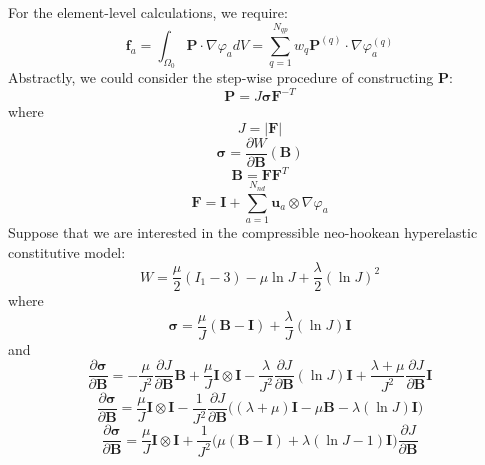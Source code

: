 \documentclass[12pt]{article}
\begin{document}
For the element-level calculations, we require:
\begin{equation}
	\mathbf{f}_a = \int_{\Omega_0} \mathbf{P} \cdot \nabla \varphi_a dV = \sum_{q = 1}^{N_{qp}} w_q \mathbf{P}^{(q)} \cdot \nabla \varphi^{(q)}_a
\end{equation}
Abstractly, we could consider the step-wise procedure of constructing $\mathbf{P}$:
\begin{equation}
	\mathbf{P} = J \boldsymbol{\sigma} \mathbf{F}^{-T}
\end{equation}
where
\begin{equation}
	J = | \mathbf{F} |
\end{equation}
\begin{equation}
	\boldsymbol{\sigma} = \frac{\partial W}{\partial \mathbf{B}} (\mathbf{B})
\end{equation}
\begin{equation}
	\mathbf{B} = \mathbf{F} \mathbf{F}^T
\end{equation}
\begin{equation}
	\mathbf{F} = \mathbf{I} + \sum_{a = 1}^{N_{nd}} \mathbf{u}_a \otimes \nabla \varphi_a
\end{equation}
Suppose that we are interested in the compressible neo-hookean hyperelastic constitutive model:
\begin{equation}
	W = \frac{\mu}{2} (I_1 - 3) - \mu \ln J + \frac{\lambda}{2} ( \ln J )^2
\end{equation}
where
\begin{equation}
	\boldsymbol{\sigma} = \frac{\mu}{J} (\mathbf{B} - \mathbf{I}) + \frac{\lambda}{J} ( \ln J ) \mathbf{I}
\end{equation}
and
\begin{equation}
	\frac{\partial \boldsymbol{\sigma}}{\partial \mathbf{B}} = - \frac{\mu}{J^2} \frac{\partial J}{\partial \mathbf{B}} \mathbf{B} + \frac{\mu}{J} \mathbf{I} \otimes \mathbf{I} - \frac{\lambda}{J^2} \frac{\partial J}{\partial \mathbf{B}} ( \ln J ) \mathbf{I} + \frac{\lambda + \mu}{J^2} \frac{\partial J}{\partial \mathbf{B}} \mathbf{I}
\end{equation}
\begin{equation}
	\frac{\partial \boldsymbol{\sigma}}{\partial \mathbf{B}} = \frac{\mu}{J} \mathbf{I} \otimes \mathbf{I} - \frac{1}{J^2} \frac{\partial J}{\partial \mathbf{B}} \bigg( (\lambda + \mu) \mathbf{I} - \mu \mathbf{B} - \lambda ( \ln J ) \mathbf{I} \bigg)
\end{equation}
\begin{equation}
	\frac{\partial \boldsymbol{\sigma}}{\partial \mathbf{B}} = \frac{\mu}{J} \mathbf{I} \otimes \mathbf{I} + \frac{1}{J^2} \bigg( \mu ( \mathbf{B} - \mathbf{I} ) + \lambda ( \ln J - 1 ) \mathbf{I} \bigg) \frac{\partial J}{\partial \mathbf{B}}
\end{equation}
\end{document}
